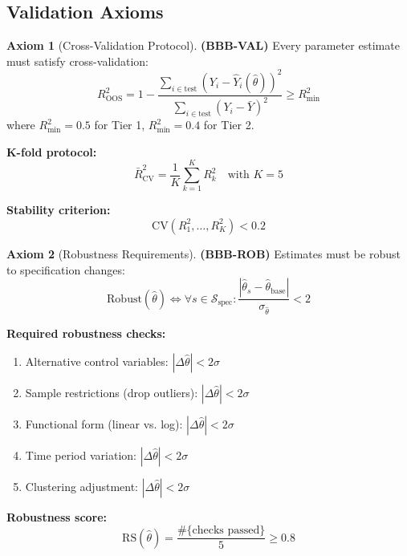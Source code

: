 \documentclass[11pt,a4paper]{article}
\theoremstyle{definition}
\newtheorem{axiom}{Axiom}[section]
\begin{document}
\subsection{Validation Axioms}

\begin{axiom}[Cross-Validation Protocol]
\label{ax:bbb-val}
\textbf{(BBB-VAL)} Every parameter estimate must satisfy cross-validation:
\begin{equation}
R^2_{\text{OOS}} = 1 - \frac{\sum_{i \in \text{test}} (Y_i - \hat{Y}_i(\hat{\theta}))^2}{\sum_{i \in \text{test}} (Y_i - \bar{Y})^2} \geq R^2_{\min}
\end{equation}
where $R^2_{\min} = 0.5$ for Tier 1, $R^2_{\min} = 0.4$ for Tier 2.

\textbf{K-fold protocol:}
\begin{equation}
\bar{R}^2_{\text{CV}} = \frac{1}{K} \sum_{k=1}^{K} R^2_k \quad \text{with } K = 5
\end{equation}

\textbf{Stability criterion:}
\begin{equation}
\text{CV}(R^2_1, \ldots, R^2_K) < 0.2
\end{equation}
\end{axiom}

\begin{axiom}[Robustness Requirements]
\label{ax:bbb-rob}
\textbf{(BBB-ROB)} Estimates must be robust to specification changes:
\begin{equation}
\text{Robust}(\hat{\theta}) \Leftrightarrow \forall s \in \mathcal{S}_{\text{spec}}: 
\frac{|\hat{\theta}_s - \hat{\theta}_{\text{base}}|}{\sigma_{\hat{\theta}}} < 2
\end{equation}

\textbf{Required robustness checks:}
\begin{enumerate}
    \item Alternative control variables: $|\Delta \hat{\theta}| < 2\sigma$
    \item Sample restrictions (drop outliers): $|\Delta \hat{\theta}| < 2\sigma$
    \item Functional form (linear vs. log): $|\Delta \hat{\theta}| < 2\sigma$
    \item Time period variation: $|\Delta \hat{\theta}| < 2\sigma$
    \item Clustering adjustment: $|\Delta \hat{\theta}| < 2\sigma$
\end{enumerate}

\textbf{Robustness score:}
\begin{equation}
\text{RS}(\hat{\theta}) = \frac{\#\{\text{checks passed}\}}{5} \geq 0.8
\end{equation}
\end{axiom}
\end{document}
